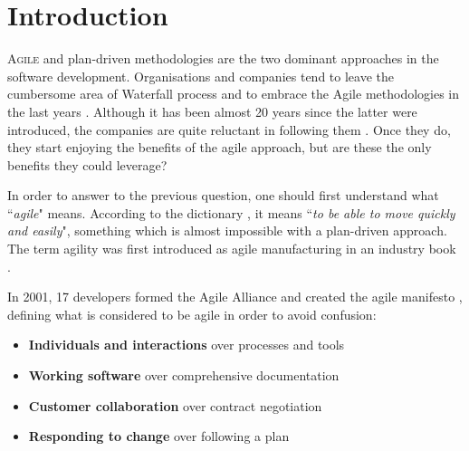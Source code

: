 \chapter{Introduction}
\label{ch:introduction}

\lettrine[lines=4, loversize=-0.1, lraise=0.1]{A}{gile} and plan-driven methodologies are the two dominant approaches in the software development. Organisations and companies tend to leave the cumbersome area of Waterfall process and to embrace the Agile methodologies in the last years \cite{laurie_williams, Wang_Conboy}. Although it has been almost 20 years since the latter were introduced, the companies are quite reluctant in following them \cite{4599456}. Once they do, they start enjoying the benefits of the agile approach, but are these the only benefits they could leverage?

In order to answer to the previous question, one should first understand what ``\textit{agile}" means. According to the dictionary \cite{cambridge_dictionary}, it means ``\textit{to be able to move quickly and easily}", something which is almost impossible with a plan-driven approach. The term agility was first introduced as agile manufacturing in an industry book \cite{agile_manufacturing}.

In 2001, 17 developers formed the Agile Alliance and created the agile manifesto \cite{beck2001agile}, defining what is considered to be agile in order to avoid confusion: 
\begin{itemize}
	\item {\large \textbf{Individuals and interactions}} over processes and tools
	\item {\large \textbf{Working software}} over comprehensive documentation
	\item {\large \textbf{Customer collaboration}} over contract negotiation
	\item {\large \textbf{Responding to change}} over following a plan
\end{itemize}

